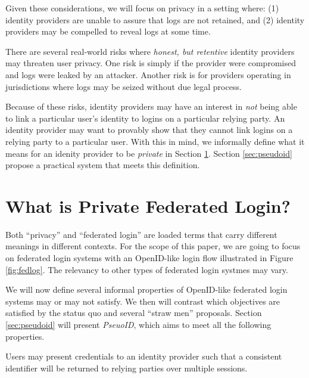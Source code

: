 \documentclass{llncs}
\begin{document}
Given these considerations, we will focus on privacy in a setting where:
(1) identity providers are unable to assure that logs are not retained, and
(2) identity providers may be compelled to reveal logs at some time.

There are several real-world risks where \emph{honest, but retentive}
identity providers may threaten user privacy. One risk is simply if
the provider were compromised and logs were leaked by an
attacker. Another risk is for providers operating in jurisdictions
where logs may be seized without due legal process. 

Because of these risks, identity providers may have an interest in \emph{not}
being able to link a particular user's identity to logins on a particular
relying party. An identity provider may want to provably show that
they cannot link logins on a relying party to a particular user. With
this in mind, we informally define what it means for an idenity
provider to be \emph{private} in Section
\ref{sec:private-fed-login}. Section \ref{sec:pseudoid} propose a
practical system that meets this definition.

\section{What is Private Federated Login?}
\label{sec:private-fed-login}

Both ``privacy'' and ``federated login'' are loaded terms that carry
different meanings in different contexts. For the scope of this paper,
we are going to focus on federated login systems with an OpenID-like
login flow illustrated in Figure \ref{fig:fedlog}. The relevancy to
other types of federated login systmes may vary.

We will now define several informal properties of OpenID-like
federated login systems may or may not satisfy. We then will contrast
which objectives are satisfied by the status quo and several ``straw
men'' proposals. Section \ref{sec:pseudoid} will present
\emph{PseuoID}, which aims to meet all the following properties.


\begin{definition}[Consistency]
\label{def:consistency}
Users may present credentials to an identity provider such that a 
consistent identifier will be returned to relying parties over
multiple sessions.
\end{definition}

\begin{definition}[Unlinkability]
\label{def:unlinkability}

\end{definition}
\end{document}
